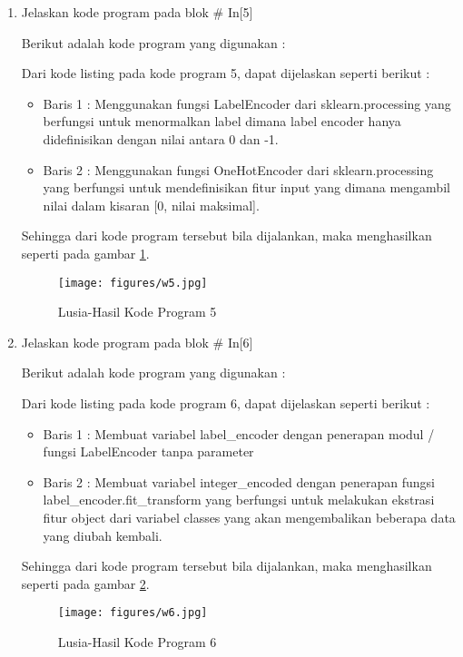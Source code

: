 \begin{enumerate}
\item Jelaskan kode program pada blok \# In[5]
	\par Berikut adalah kode program yang digunakan :
	
	\par Dari kode listing pada kode program 5, dapat dijelaskan seperti berikut :
	\begin{itemize}
	\item Baris 1	: Menggunakan fungsi LabelEncoder dari sklearn.processing yang berfungsi untuk menormalkan label dimana label encoder hanya didefinisikan dengan nilai antara 0 dan -1.
	\item Baris 2	: Menggunakan fungsi OneHotEncoder dari sklearn.processing yang berfungsi untuk mendefinisikan fitur input yang dimana mengambil nilai dalam kisaran [0, nilai maksimal].
	\end{itemize}
	\par Sehingga dari kode program tersebut bila dijalankan, maka menghasilkan seperti pada gambar \ref{7B5}.
		\begin{figure}[!hbtp]
		\centering
		\texttt{[image: figures/w5.jpg]}
		\caption{Lusia-Hasil Kode Program 5}
		\label{7B5}
		\end{figure}
	
\item Jelaskan kode program pada blok \# In[6]
	\par Berikut adalah kode program yang digunakan :
	
	\par Dari kode listing pada kode program 6, dapat dijelaskan seperti berikut :
	\begin{itemize}
	\item Baris 1	: Membuat variabel label\_encoder dengan penerapan modul / fungsi LabelEncoder tanpa parameter
	\item Baris 2	: Membuat variabel integer\_encoded dengan penerapan fungsi label\_encoder.fit\_transform yang berfungsi untuk melakukan ekstrasi fitur object dari variabel classes yang akan mengembalikan beberapa data yang diubah kembali.
	\end{itemize}
	\par Sehingga dari kode program tersebut bila dijalankan, maka menghasilkan seperti pada gambar \ref{7B6}.
		\begin{figure}[!hbtp]
		\centering
		\texttt{[image: figures/w6.jpg]}
		\caption{Lusia-Hasil Kode Program 6}
		\label{7B6}
		\end{figure}


\end{enumerate}

